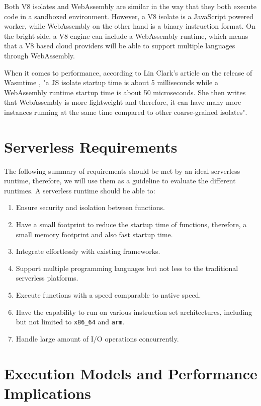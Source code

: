Both \gls{V8} isolates and WebAssembly are similar in the way that they both execute code in a sandboxed environment. However, a V8 isolate is a JavaScript powered worker, while WebAssembly on the other hand is a binary instruction format. On the bright side, a V8 engine can include a WebAssembly runtime, which means that a V8 based cloud providers will be able to support multiple languages through WebAssembly. 

When it comes to performance, according to Lin Clark's article on the release of Wasmtime \cite{clark_2022_wasmtime}, "a JS isolate startup time is about 5 milliseconds while a WebAssembly runtime startup time is about 50 microseconds. She then writes that WebAssembly is more lightweight and therefore, it can have many more instances running at the same time compared to other coarse-grained isolates". 

\section{Serverless Requirements}
\label{sec:serverless-requirements}

The following summary of requirements should be met by an ideal serverless runtime, therefore, we will use them as a guideline to evaluate the different runtimes. 
A serverless runtime should be able to:
%
\begin{enumerate}
	\item Ensure security and isolation between functions.
	\item Have a small footprint to reduce the startup time of functions, therefore, a small memory footprint and also fast startup time. 
	\item Integrate effortlessly with existing frameworks. 
	\item Support multiple programming languages but not less to the traditional serverless platforms. 
	\item Execute functions with a speed comparable to native speed.
	\item Have the capability to run on various instruction set architectures, including but not limited to \texttt{x86\_64} and \texttt{arm}.
	\item Handle large amount of I/O operations concurrently.
\end{enumerate}

\section{Execution Models and Performance Implications}
\label{sec:execution-models-and-performance-implications}

